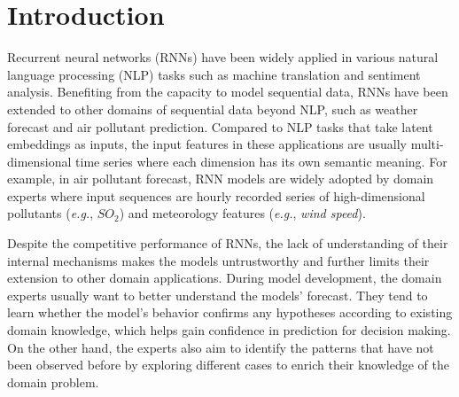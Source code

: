 \section{Introduction}
\label{section:introduction}
Recurrent neural networks (RNNs) have been widely applied in various natural language processing (NLP) tasks such as machine translation and sentiment analysis. 
Benefiting from the capacity to model sequential data, RNNs have been extended to other domains of sequential data beyond NLP, such as weather forecast\cite{xingjian2015convolutional, cao2012forecasting, shi2017deep} and air pollutant prediction\cite{oprea2016neural, zhou2017prediction, li2017long}. 
Compared to NLP tasks that take latent embeddings as inputs, the input features in these applications are usually multi-dimensional time series where each dimension has its own semantic meaning.
For example, in air pollutant forecast, RNN models are widely adopted by domain experts where input sequences are hourly recorded series of high-dimensional pollutants (\emph{e.g.}, $SO_{2}$) and meteorology features (\emph{e.g.}, \textit{wind speed}).

Despite the competitive performance of RNNs, the lack of understanding of their internal mechanisms makes the models untrustworthy and further limits their extension to other domain applications. 
During model development, the domain experts usually want to better understand the models' forecast.
They tend to learn whether the model's behavior confirms any hypotheses according to existing domain knowledge, which helps gain confidence in prediction for decision making.
On the other hand, the experts also aim to identify the patterns that have not been observed before by exploring different cases to enrich their knowledge of the domain problem.

